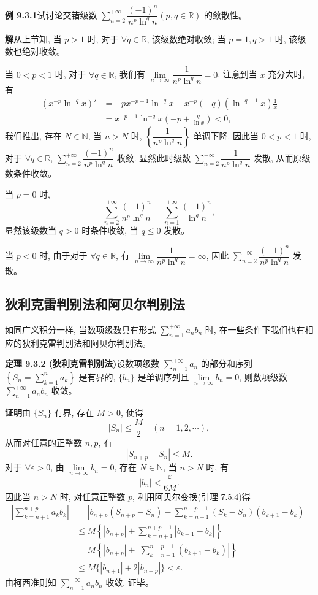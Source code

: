 \documentclass[UTF8,12pt,a4paper,fontset=fandol]{ctexart}
\begin{document}
\noindent\textbf{例 9.3.1}\quad 试讨论交错级数 $\sum\limits_{n=2}^{+\infty}\dfrac{(-1)^n}{n^p\ln^q n}(p,q\in\mathbb{R})$ 的敛散性。

\noindent\textbf{解}\quad 从上节知, 当 $p>1$ 时, 对于 $\forall q\in\mathbb{R}$, 该级数绝对收敛; 当 $p=1,q>1$ 时, 该级数也绝对收敛。

当 $0<p<1$ 时, 对于 $\forall q\in\mathbb{R}$, 我们有 $\lim\limits_{n\to\infty}\dfrac1{n^p\ln^q n}=0$. 注意到当 $x$ 充分大时, 有
\[
\begin{aligned}
  (x^{-p}\ln^{-q}x)'
  &=-px^{-p-1}\ln^{-q}x-x^{-p}(-q)(\ln^{-q-1}x)\frac1x\\
  &=x^{-p-1}\ln^{-q}x\left(-p+\frac{q}{\ln x}\right)<0,
\end{aligned}
\]
我们推出, 存在 $N\in\mathbb{N}$, 当 $n>N$ 时, $\left\{\dfrac1{n^p\ln^q n}\right\}$ 单调下降. 因此当 $0<p<1$ 时, 对于 $\forall q\in\mathbb{R}$, $\sum\limits_{n=2}^{+\infty}\dfrac{(-1)^n}{n^p\ln^q n}$ 收敛. 显然此时级数 $\sum\limits_{n=2}^{+\infty}\dfrac1{n^p\ln^q n}$ 发散, 从而原级数条件收敛。

当 $p=0$ 时,
\[
  \sum_{n=2}^{+\infty}\frac{(-1)^n}{n^p\ln^q n}
  =\sum_{n=1}^{+\infty}\frac{(-1)^n}{\ln^q n},
\]
显然该级数当 $q>0$ 时条件收敛, 当 $q\leq0$ 发散。

当 $p<0$ 时, 由于对于 $\forall q\in\mathbb{R}$, 有 $\lim\limits_{n\to\infty}\dfrac1{n^p\ln^q n}=\infty$, 因此 $\sum\limits_{n=2}^{+\infty}\dfrac{(-1)^n}{n^p\ln^q n}$ 发散。

\subsection{狄利克雷判别法和阿贝尔判别法}

如同广义积分一样, 当数项级数具有形式 $\sum\limits_{n=1}^{+\infty}a_nb_n$ 时, 在一些条件下我们也有相应的狄利克雷判别法和阿贝尔判别法。

\noindent\textbf{定理 9.3.2 (狄利克雷判别法)}\quad 设数项级数 $\sum\limits_{n=1}^{+\infty}a_n$ 的部分和序列 $\left\{S_n=\sum\limits_{k=1}^n a_k\right\}$ 是有界的, $\{b_n\}$ 是单调序列且 $\lim\limits_{n\to\infty}b_n=0$, 则数项级数 $\sum\limits_{n=1}^{+\infty}a_nb_n$ 收敛。

\noindent\textbf{证明}\quad 由 $\{S_n\}$ 有界, 存在 $M>0$, 使得
\[
  |S_n|\leq\frac{M}{2}\quad(n=1,2,\cdots),
\]
从而对任意的正整数 $n,p$, 有
\[
  |S_{n+p}-S_n|\leq M.
\]
对于 $\forall\varepsilon>0$, 由 $\lim\limits_{n\to\infty}b_n=0$, 存在 $N\in\mathbb{N}$, 当 $n>N$ 时, 有
\[
  |b_n|<\frac{\varepsilon}{6M}.
\]
因此当 $n>N$ 时, 对任意正整数 $p$, 利用阿贝尔变换(引理 7.5.4)得
\[
\begin{aligned}
  \left|\sum_{k=n+1}^{n+p}a_kb_k\right|
  &=\left|b_{n+p}(S_{n+p}-S_n)-\sum_{k=n+1}^{n+p-1}(S_k-S_n)(b_{k+1}-b_k)\right|\\
  &\leq M\left\{|b_{n+p}|+\sum_{k=n+1}^{n+p-1}|b_{k+1}-b_k|\right\}\\
  &=M\left\{|b_{n+p}|+\left|\sum_{k=n+1}^{n+p-1}(b_{k+1}-b_k)\right|\right\}\\
  &\leq M\{|b_{n+1}|+2|b_{n+p}|\}<\varepsilon.
\end{aligned}
\]
由柯西准则知 $\sum\limits_{n=1}^{+\infty}a_nb_n$ 收敛. 证毕。
\end{document}
